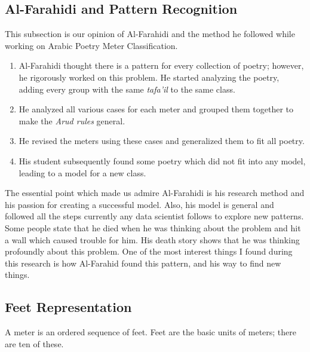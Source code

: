 \subsection{Al-Farahidi and Pattern Recognition}

This subsection is our opinion of Al-Farahidi and the method he followed while working on Arabic Poetry Meter Classification.

\begin{enumerate}
  \item Al-Farahidi thought there is a pattern for every collection of poetry; however, he rigorously worked on this problem. He started analyzing the poetry, adding every group with the same \textit{tafa'il} to the same class.
  \item {\color{red} He analyzed all various cases for each meter and grouped them together to make the \textit{Arud rules} general.}
  \item He revised the meters using these cases and generalized them to fit all poetry.
  \item His student subsequently found some poetry which did not fit into any model, leading to a model for a new class.
\end{enumerate}

The essential point which made us admire Al-Farahidi is his research method and his passion for creating a successful model. Also, his model is general and followed all the steps currently any data scientist follows to explore new patterns. Some people state that he died when he was thinking about the problem and hit a wall which caused trouble for him. His death story shows that he was thinking profoundly about this problem. One of the most interest things I found during this research is how Al-Farahid found this pattern, and his way to find new things.

\subsection{Feet Representation}
A meter is an ordered sequence of feet. Feet are the basic units of meters; there are ten of these.


